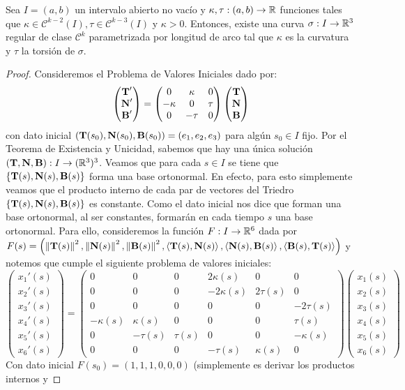 \begin{teo}
Sea $I=(a,b)$ un intervalo abierto no vacío y $\kappa,\tau:(a,b)\to\mathbb{R}$ funciones tales que $\kappa\in\mathscr{C}^{k-2}(I),\tau\in\mathscr{C}^{k-3}(I)$ y $\kappa>0$. Entonces, existe una curva $\sigma:I\to\mathbb{R}^3$ regular de clase $\mathscr{C}^k$ parametrizada por longitud de arco tal que $\kappa$ es la curvatura y $\tau$ la torsión de $\sigma$.
\begin{proof}
Consideremos el Problema de Valores Iniciales dado por: $$\begin{pmatrix}\operatorname{\mathbf{T}}' \\ \operatorname{\mathbf{N}}'\\ \operatorname{\mathbf{B}}'\end{pmatrix} = \begin{pmatrix}0& \kappa & 0 \\ -\kappa & 0 & \tau \\ 0 & -\tau & 0\end{pmatrix}\begin{pmatrix}\operatorname{\mathbf{T}} \\ \operatorname{\mathbf{N}} \\ \operatorname{\mathbf{B}}\end{pmatrix}$$ con dato inicial $(\operatorname{\mathbf{T}}(s_0),\operatorname{\mathbf{N}}(s_0),\operatorname{\mathbf{B}}(s_0))=(e_1,e_2,e_3)$ para algún $s_0\in I$ fijo. Por el Teorema de Existencia y Unicidad, sabemos que hay una única solución $(\operatorname{\mathbf{T}},\operatorname{\mathbf{N}},\operatorname{\mathbf{B}}):I\to(\mathbb{R}^3)^3$. Veamos que para cada $s\in I$ se tiene que $\{\operatorname{\mathbf{T}}(s),\operatorname{\mathbf{N}}(s),\operatorname{\mathbf{B}}(s)\}$ forma una base ortonormal. En efecto, para esto simplemente veamos que el producto interno de cada par de vectores del Triedro $\{\operatorname{\mathbf{T}}(s),\operatorname{\mathbf{N}}(s),\operatorname{\mathbf{B}}(s)\}$ es constante. Como el dato inicial nos dice que forman una base ortonormal, al ser constantes, formarán en cada tiempo $s$ una base ortonormal. Para ello, consideremos la función $F:I\to\mathbb{R}^6$ dada por $F(s)=\left(\left\| \operatorname{\mathbf{T}}(s) \right\|^2,\left\| \operatorname{\mathbf{N}}(s) \right\|^2,\left\| \operatorname{\mathbf{B}}(s) \right\|^2,\left\langle \operatorname{\mathbf{T}}(s),\operatorname{\mathbf{N}}(s) \right\rangle,\left\langle \operatorname{\mathbf{N}}(s),\operatorname{\mathbf{B}}(s) \right\rangle,\left\langle \operatorname{\mathbf{B}}(s),\operatorname{\mathbf{T}}(s) \right\rangle\right)$ y notemos que cumple el siguiente problema de valores iniciales: $$\begin{pmatrix}x_1'(s)\\ x_2'(s)\\x_3'(s)\\x_4'(s)\\x_5'(s)\\x_6'(s)\end{pmatrix} = \begin{pmatrix}0&0&0&2\kappa(s)&0&0\\ 0&0&0&-2\kappa(s)&2\tau(s)&0\\ 0&0&0&0&0&-2\tau(s)\\ -\kappa(s)&\kappa(s)&0&0&0&\tau(s)\\ 0&-\tau(s)&\tau(s)&0&0&-\kappa(s)\\0&0&0&-\tau(s)&\kappa(s)&0\end{pmatrix}\begin{pmatrix}x_1(s)\\ x_2(s)\\x_3(s)\\x_4(s)\\x_5(s)\\x_6(s)\end{pmatrix}$$ Con dato inicial $F(s_0)=(1,1,1,0,0,0)$ (simplemente es derivar los productos internos y 
\end{proof}
\end{teo}
